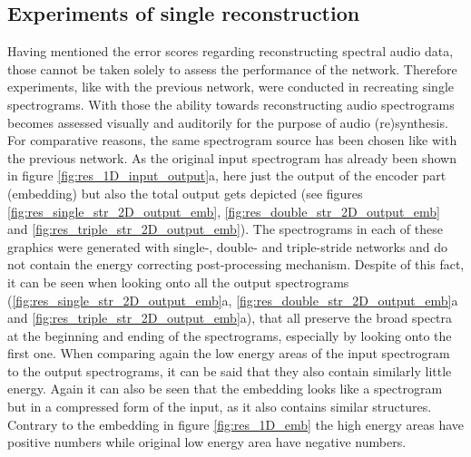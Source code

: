 \subsection{Experiments of single reconstruction}
Having mentioned the error scores regarding reconstructing spectral audio data, those cannot be taken solely to assess the performance of the network. Therefore experiments, like with the previous network, were conducted in recreating single spectrograms. With those the ability towards reconstructing audio spectrograms becomes assessed visually and auditorily for the purpose of audio (re)synthesis.
For comparative reasons, the same spectrogram source has been chosen like with the previous network. As the original input spectrogram has already been shown in figure \ref{fig:res_1D_input_output}a, here just the output of the encoder part (embedding) but also the total output gets depicted (see figures \ref{fig:res_single_str_2D_output_emb}, \ref{fig:res_double_str_2D_output_emb} and \ref{fig:res_triple_str_2D_output_emb}). The spectrograms in each of these graphics were generated with single-, double- and triple-stride networks and do not contain the energy correcting post-processing mechanism. Despite of this fact, it can be seen when looking onto all the output spectrograms (\ref{fig:res_single_str_2D_output_emb}a, \ref{fig:res_double_str_2D_output_emb}a and \ref{fig:res_triple_str_2D_output_emb}a), that all preserve the broad spectra at the beginning and ending of the spectrograms, especially by looking onto the first one. When comparing again the low energy areas of the input spectrogram to the output spectrograms, it can be said that they also contain similarly little energy. Again it can also be seen that the embedding looks like a spectrogram but in a compressed form of the input, as it also contains similar structures. Contrary to the embedding in figure \ref{fig:res_1D_emb} the high energy areas have positive numbers while original low energy area have negative numbers.

